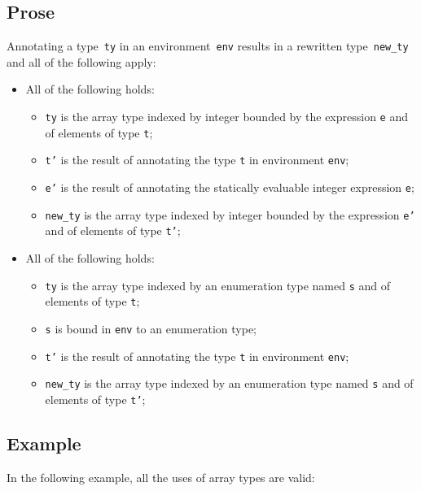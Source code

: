 \documentclass{book}
\begin{document}
\begin{itemize}
\subsection{Prose}
Annotating a type~\texttt{ty} in an environment~\texttt{env} results in a
rewritten type~\texttt{new\_ty} and all of the following apply:
\begin{itemize}
  \item All of the following holds:
    \begin{itemize}
      \item \texttt{ty} is the array type indexed by integer bounded by the
        expression \texttt{e} and of elements of type \texttt{t};
      \item \texttt{t'} is the result of annotating the type \texttt{t} in
        environment \texttt{env};
      \item \texttt{e'} is the result of annotating the statically evaluable
        integer expression \texttt{e};
      \item \texttt{new\_ty} is the array type indexed by integer bounded by
        the expression \texttt{e'} and of elements of type \texttt{t'};
    \end{itemize}
  \item All of the following holds:
    \begin{itemize}
      \item \texttt{ty} is the array type indexed by an enumeration type named
        \texttt{s} and of elements of type \texttt{t};
      \item \texttt{s} is bound in \texttt{env} to an enumeration type;
      \item \texttt{t'} is the result of annotating the type \texttt{t} in
        environment \texttt{env};
      \item \texttt{new\_ty} is the array type indexed by an enumeration type
        named \texttt{s} and of elements of type \texttt{t'};
    \end{itemize}
\end{itemize}

\subsection{Example}
In the following example, all the uses of array types are valid:





\end{itemize}
\end{document}
